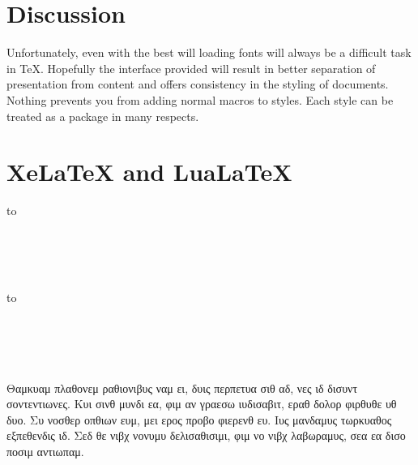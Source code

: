 \section{Discussion}


Unfortunately, even with the best will loading fonts will always be a difficult task in TeX. Hopefully the interface provided will result in better separation of presentation from content and offers consistency in the styling of documents. Nothing prevents you from adding normal macros to styles. Each style can be treated as a package in many respects.



\section{XeLaTeX and LuaLaTeX}



\bgroup
{}
\begin{minipage}[t]{.2\linewidth}
\hbox to 
\end{minipage}
\begin{minipage}[t]{.75\linewidth}
^^A
\noindent\fox\\
\alphabet\\
\punctuation\\
\frogking
\end{minipage}
\egroup

\bgroup
{}
\begin{minipage}[t]{.2\linewidth}
\hbox to 
\end{minipage}
\begin{minipage}[t]{.65\linewidth}
^^A
\noindent\fox\\
\alphabet\\
\textsc{\alphabet}\\
\punctuation\\
\frogking
Θαμκυαμ πλαθονεμ ραθιονιβυς ναμ ει, δυις περπετυα σιθ αδ, νες ιδ δισυντ σοντεντιωνες. Κυι σινθ μυνδι εα, φιμ αν γραεσω ιυδισαβιτ, εραθ δολορ φιρθυθε υθ δυο. Συ νοσθερ οπθιων ευμ, μει ερος προβο φιερενθ ευ. Ιυς μανδαμυς τωρκυαθος εξπεθενδις ιδ. Σεδ θε νιβχ νονυμυ δελισαθισιμι, φιμ νο νιβχ λαβωραμυς, σεα εα δισο ποσιμ αντιωπαμ.
\end{minipage}
\egroup

